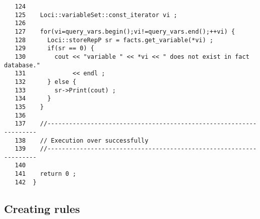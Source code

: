 \begin{verbatim}
   124
   125    Loci::variableSet::const_iterator vi ;
   126
   127    for(vi=query_vars.begin();vi!=query_vars.end();++vi) {
   128      Loci::storeRepP sr = facts.get_variable(*vi) ;
   129      if(sr == 0) {
   130        cout << "variable " << *vi << " does not exist in fact database."
   131             << endl ;
   132      } else {
   133        sr->Print(cout) ;
   134      }
   135    }
   136
   137    //-------------------------------------------------------------------
   138    // Execution over successfully
   139    //-------------------------------------------------------------------
   140
   141    return 0 ;
   142  }
\end{verbatim}

\subsection { Creating rules }
